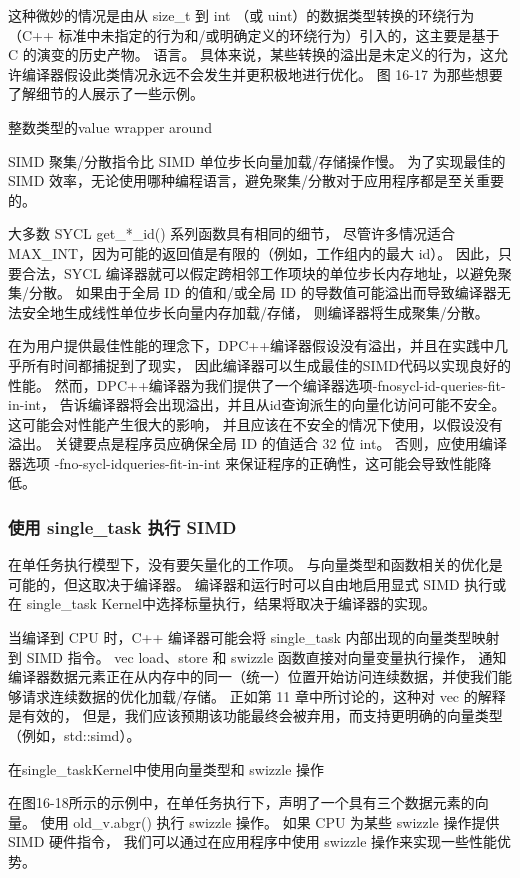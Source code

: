 这种微妙的情况是由从 size\_t 到 int （或 uint）的数据类型转换的环绕行为
（C++ 标准中未指定的行为和/或明确定义的环绕行为）引入的，这主要是基于 C 的演变的历史产物。 
语言。 具体来说，某些转换的溢出是未定义的行为，这允许编译器假设此类情况永远不会发生并更积极地进行优化。 
图 16-17 为那些想要了解细节的人展示了一些示例。

{\color{red} 整数类型的value wrapper around}

SIMD 聚集/分散指令比 SIMD 单位步长向量加载/存储操作慢。 
为了实现最佳的 SIMD 效率，无论使用哪种编程语言，避免聚集/分散对于应用程序都是至关重要的。

大多数 SYCL get\_*\_id() 系列函数具有相同的细节，
尽管许多情况适合 MAX\_INT，因为可能的返回值是有限的（例如，工作组内的最大 id）。 
因此，只要合法，SYCL 编译器就可以假定跨相邻工作项块的单位步长内存地址，以避免聚集/分散。 
如果由于全局 ID 的值和/或全局 ID 的导数值可能溢出而导致编译器无法安全地生成线性单位步长向量内存加载/存储，
则编译器将生成聚集/分散。

在为用户提供最佳性能的理念下，DPC++编译器假设没有溢出，并且在实践中几乎所有时间都捕捉到了现实，
因此编译器可以生成最佳的SIMD代码以实现良好的性能。 
然而，DPC++编译器为我们提供了一个编译器选项-fnosycl-id-queries-fit-in-int，
告诉编译器将会出现溢出，并且从id查询派生的向量化访问可能不安全。 这可能会对性能产生很大的影响，
并且应该在不安全的情况下使用，以假设没有溢出。 关键要点是程序员应确保全局 ID 的值适合 32 位 int。 
否则，应使用编译器选项 -fno-sycl-idqueries-fit-in-int 来保证程序的正确性，这可能会导致性能降低。

\subsubsection{使用 single\_task 执行 SIMD}
在单任务执行模型下，没有要矢量化的工作项。 与向量类型和函数相关的优化是可能的，但这取决于编译器。 
编译器和运行时可以自由地启用显式 SIMD 执行或在 single\_task Kernel中选择标量执行，结果将取决于编译器的实现。

当编译到 CPU 时，C++ 编译器可能会将 single\_task 内部出现的向量类型映射到 SIMD 指令。 
vec load、store 和 swizzle 函数直接对向量变量执行操作，
通知编译器数据元素正在从内存中的同一（统一）位置开始访问连续数据，并使我们能够请求连续数据的优化加载/存储。 
正如第 11 章中所讨论的，这种对 vec 的解释是有效的，
但是，我们应该预期该功能最终会被弃用，而支持更明确的向量类型（例如，std::simd）。

{\color{red} 在single\_taskKernel中使用向量类型和 swizzle 操作}

在图16-18所示的示例中，在单任务执行下，声明了一个具有三个数据元素的向量。 
使用 old\_v.abgr() 执行 swizzle 操作。 如果 CPU 为某些 swizzle 操作提供 SIMD 硬件指令，
我们可以通过在应用程序中使用 swizzle 操作来实现一些性能优势。

